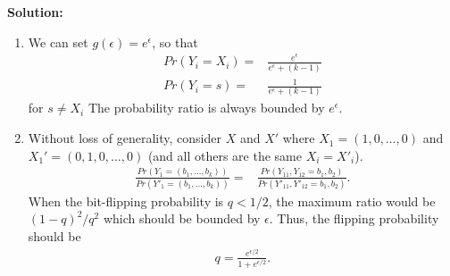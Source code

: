 \documentclass[12pt]{article}
\begin{document}
\begin{enumerate}
\begin{solution}
{\bf Solution: }\\
\begin{enumerate}
    \item We can set $g(\epsilon) = e^{\epsilon}$, so that
    \begin{align*}
        Pr(Y_i=X_i) =& \frac{e^\epsilon}{e^\epsilon +(k-1)}\\
        Pr(Y_i=s) =& \frac{1}{e^\epsilon +(k-1)}
    \end{align*}
    for $s\neq X_i$
    The probability ratio is always bounded by $e^{\epsilon}$.

    \item Without loss of generality, 
    consider $X$ and $X'$ where $X_1 = (1, 0, \dots, 0)$ and $X_1'= (0, 1, 0, \dots, 0)$ (and all others are the same $X_i=X'_i$).
    \begin{align*}
        \frac{Pr(Y_1= (b_1, \dots, b_k))}{Pr(Y'_1=(b_1, \dots, b_k))} 
        =& \frac{Pr(Y_{11}, Y_{12} = b_1, b_2)}{Pr(Y'_{11}, Y'_{12}=b_1, b_2)}.
    \end{align*}
    When the bit-flipping probability is $q < 1/2$, the maximum ratio would be $(1-q)^2/q^2$ which should be bounded by $\epsilon$.
    Thus, the flipping probability should be
    \begin{align*}
        q = \frac{e^{\epsilon/2}}{1+e^{\epsilon/2}}.
    \end{align*}
\end{enumerate}
\end{solution}




\end{enumerate}
\end{document}
